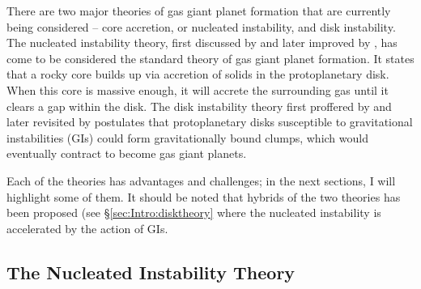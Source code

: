 There are two major theories of gas giant planet formation that are
currently being considered -- core accretion, or nucleated instability, and disk instability. The nucleated instability theory, first discussed by \citet{safronov1969} and later improved by \citet{mizuno1980}, has come to be considered the standard theory of gas giant planet formation. It states that a rocky core builds up via accretion of solids in the protoplanetary disk. When this core is massive enough, it will accrete the surrounding gas until it clears a gap within the disk. The disk instability theory first proffered by \citet{kup1951} and later revisited by \citet{boss1997} postulates that protoplanetary disks susceptible to gravitational instabilities (GIs) could form gravitationally bound clumps, which would eventually contract to become gas giant planets. 

Each of the theories has advantages and challenges; in the next sections, I will highlight some of them. It should be noted that hybrids of the two theories has been proposed (see \S\ref{sec:Intro:disktheory} where the nucleated instability is accelerated by the action of GIs.

\subsection{The Nucleated Instability Theory}\label{sec:coretheory}

